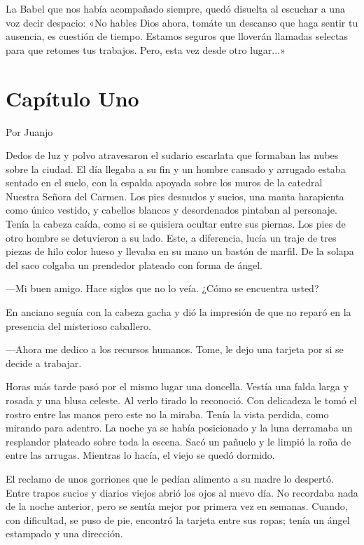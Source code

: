 \documentclass[11pt,twoside,openright,a5paper]{book}
\begin{document}
La Babel que nos había acompañado siempre, quedó disuelta al escuchar a una voz decir despacio: «No hables Dios ahora, tomáte un descanso que haga sentir tu ausencia, es cuestión de tiempo. Estamos seguros que lloverán llamadas selectas para que retomes tus trabajos. Pero, esta vez desde otro lugar...»

\section*{Capítulo Uno}

                                                                                                       \begin{flushright}Por Juanjo\end{flushright}

Dedos de luz y polvo atravesaron el sudario escarlata que formaban las nubes sobre la ciudad. El día llegaba a su fin y un hombre cansado y arrugado estaba sentado en el suelo, con la espalda apoyada sobre los muros de la catedral Nuestra Señora del Carmen. Los pies desnudos y sucios, una manta harapienta como único vestido,  y cabellos blancos y desordenados pintaban al personaje. Tenía la cabeza caída, como si se quisiera ocultar entre sus piernas. Los pies de otro hombre se detuvieron a su lado. Este, a diferencia, lucía un traje de tres piezas de hilo color hueso y llevaba en su mano un bastón de marfil. De la solapa del saco colgaba un prendedor plateado con forma de ángel.

---Mi buen amigo. Hace siglos que no lo veía. ¿Cómo se encuentra usted?

En anciano seguía con la cabeza gacha y dió la impresión de que no reparó en la presencia del misterioso caballero.

---Ahora me dedico a los recursos humanos. Tome, le dejo una tarjeta por si se decide a trabajar.


Horas más tarde pasó por el mismo lugar una doncella. Vestía una falda larga y rosada y una blusa celeste. Al verlo tirado lo reconoció. Con delicadeza le tomó el rostro entre las manos pero este no la miraba. Tenía la vista perdida, como mirando para adentro.
La noche ya se había posicionado y la luna derramaba un resplandor plateado sobre toda la escena. Sacó un pañuelo y le limpió la roña de entre las arrugas. Mientras lo hacía, el viejo se quedó dormido.


El reclamo de unos gorriones que le pedían alimento a su madre lo despertó. Entre trapos sucios y diarios viejos abrió los ojos al nuevo día. No recordaba nada de la noche anterior, pero se sentía mejor por primera vez en semanas. Cuando, con dificultad, se puso de pie, encontró la tarjeta entre sus ropas; tenía un ángel estampado y una dirección.
\end{document}
